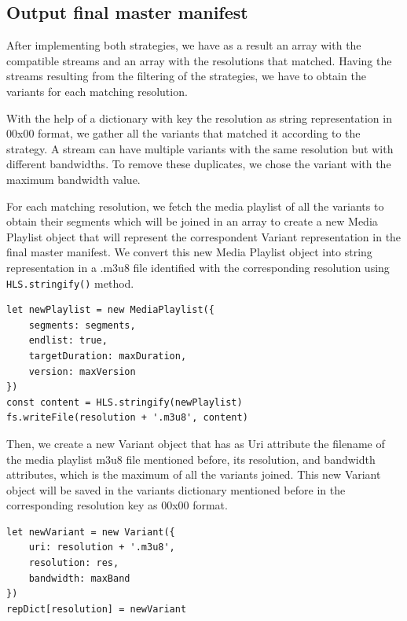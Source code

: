 \subsection{Output final master manifest}

After implementing both strategies, we have as a result an array with the compatible streams and an array with the resolutions that matched.
Having the streams resulting from the filtering of the strategies, we have to obtain the variants for each matching resolution.

With the help of a dictionary with key the resolution as string representation in 00x00 format, we gather all the variants that matched it according to the strategy. A stream can have multiple variants with the same resolution but with different bandwidths. To remove these duplicates, we chose the variant with the maximum bandwidth value.

For each matching resolution, we fetch the media playlist of all the variants to obtain their segments which will be joined in an array to create a new Media Playlist object that will represent the correspondent Variant representation in the final master manifest. We convert this new Media Playlist object into string representation in a .m3u8 file identified with the corresponding resolution using \Verb|HLS.stringify()| method.

\begin{lstlisting}
let newPlaylist = new MediaPlaylist({
    segments: segments,
    endlist: true,
    targetDuration: maxDuration,
    version: maxVersion
})
const content = HLS.stringify(newPlaylist)
fs.writeFile(resolution + '.m3u8', content)
\end{lstlisting}

Then, we create a new Variant object that has as Uri attribute the filename of the media playlist m3u8 file mentioned before, its resolution, and bandwidth attributes, which is the maximum of all the variants joined. This new Variant object will be saved in the variants dictionary mentioned before in the corresponding resolution key as 00x00 format.

\begin{lstlisting}
let newVariant = new Variant({
    uri: resolution + '.m3u8',
    resolution: res,
    bandwidth: maxBand
})
repDict[resolution] = newVariant
\end{lstlisting}

